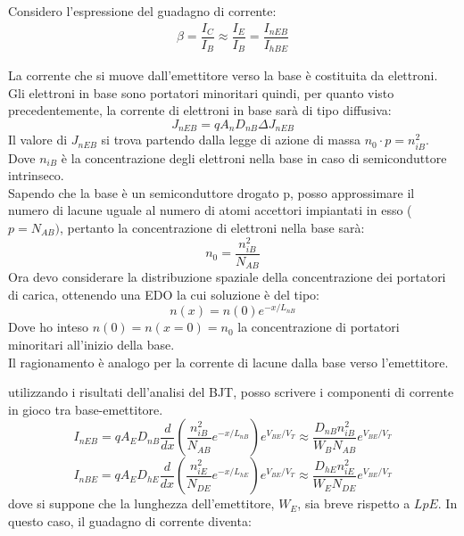 Considero l'espressione del guadagno di corrente:
\begin{align}
    \beta = \dfrac{I_C}{I_B} \approx \dfrac{I_E}{I_B} = \dfrac{I_{nEB}}{I_{hBE}}
\end{align}
\begin{ripasso}
La corrente che si muove dall'emettitore verso la base è costituita da elettroni. Gli elettroni in base sono portatori minoritari quindi, per quanto visto precedentemente, la corrente di elettroni in base sarà di tipo diffusiva:
\begin{equation*}
    J_{nEB}=qA_nD_{nB} \Delta J_{nEB}
\end{equation*}
Il valore di $J_{nEB}$ si trova partendo dalla legge di azione di massa $n_0 \cdot p = n_{iB}^2$. Dove $n_{iB}$ è la concentrazione degli elettroni nella base in caso di semiconduttore intrinseco.\\
Sapendo che la base è un semiconduttore drogato p, posso approssimare il numero di lacune uguale al numero di atomi accettori impiantati in esso ($p = N_{AB})$, pertanto la concentrazione di elettroni nella base sarà:
\begin{equation*}
    n_0 = \dfrac{n_{iB}^2}{N_{AB}}
\end{equation*}
Ora devo considerare la distribuzione spaziale della concentrazione dei portatori di carica, ottenendo una EDO la cui soluzione è del tipo:
\begin{equation*}
    n(x)=n(0)e^{-x/L_{nB}} 
\end{equation*}
Dove ho inteso $n(0)=n(x=0)=n_0$ la concentrazione di portatori minoritari all'inizio della base.\\
Il ragionamento è analogo per la corrente di lacune dalla base verso l'emettitore.

\end{ripasso}
utilizzando i risultati dell'analisi del BJT, posso scrivere i componenti di corrente in gioco tra base-emettitore. 
\begin{equation}
    I_{nEB}=qA_ED_{nB}\dfrac{d}{dx}\left( \dfrac{n_{iB}^2}{N_{AB}}e^{-x/L_{nB}}\right)e^{V_{BE}/V_T} \approx \dfrac{D_{nB}n_{iB}^2}{W_B N_{AB}}e^{V_{BE}/V_T}
\end{equation}
\begin{equation}
    I_{nBE}=qA_ED_{hE}\dfrac{d}{dx}\left( \dfrac{n_{iE}^2}{N_{DE}}e^{-x/L_{hE}}\right)e^{V_{BE}/V_T} \approx \dfrac{D_{hE}n_{iE}^2}{W_E N_{DE}}e^{V_{BE}/V_T}
\end{equation}
dove si suppone che la lunghezza dell'emettitore, $W_E$, sia breve rispetto a $LpE$. In questo caso, il guadagno di corrente diventa:
